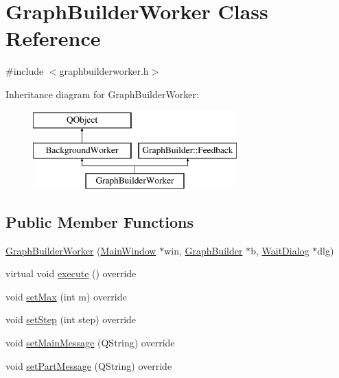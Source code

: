 \hypertarget{class_graph_builder_worker}{}\section{Graph\+Builder\+Worker Class Reference}
\label{class_graph_builder_worker}


{\ttfamily \#include $<$graphbuilderworker.\+h$>$}

Inheritance diagram for Graph\+Builder\+Worker\+:\begin{figure}[H]
\begin{center}
\leavevmode
\includegraphics[height=3.000000cm]{dd/d83/class_graph_builder_worker}
\end{center}
\end{figure}
\subsection*{Public Member Functions}
\begin{DoxyCompactItemize}
\item 
\mbox{\hyperlink{class_graph_builder_worker_af47f0e2ca343b0a2b12ee212a09942d8}{Graph\+Builder\+Worker}} (\mbox{\hyperlink{class_main_window}{Main\+Window}} $\ast$win, \mbox{\hyperlink{class_graph_builder}{Graph\+Builder}} $\ast$b, \mbox{\hyperlink{class_wait_dialog}{Wait\+Dialog}} $\ast$dlg)
\item 
virtual void \mbox{\hyperlink{class_graph_builder_worker_a60151549187952017cad7da0f8a4749a}{execute}} () override
\item 
void \mbox{\hyperlink{class_graph_builder_worker_a21bd8a386a56f5233104fc49aa6d68df}{set\+Max}} (int m) override
\item 
void \mbox{\hyperlink{class_graph_builder_worker_ab152daded1da5a91383b9ad1ef512a03}{set\+Step}} (int step) override
\item 
void \mbox{\hyperlink{class_graph_builder_worker_a65cd297bf7f96ff578450778fab236a8}{set\+Main\+Message}} (Q\+String) override
\item 
void \mbox{\hyperlink{class_graph_builder_worker_a2205ca5c5a60a6e5e97153a4c69a1d76}{set\+Part\+Message}} (Q\+String) override
\end{DoxyCompactItemize}
